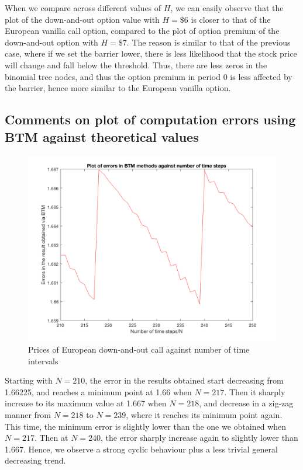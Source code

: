 When we compare across different values of $H$, we can easily observe that the plot of the down-and-out option value with $H=\$6$ is closer to that of the European vanilla call option, compared to the plot of option premium of the down-and-out option with $H = \$7$. The reason is similar to that of the previous case, where if we set the barrier lower, there is less likelihood that the stock price will change and fall below the threshold. Thus, there are less zeros in the binomial tree nodes, and thus the option premium in period 0 is less affected by the barrier, hence more similar to the European vanilla option.

\newpage

\subsection{Comments on plot of computation errors using BTM against theoretical values}
\begin{figure}[htbp!]
	\centering
	\includegraphics[scale=0.3]{A1_4_plot.PNG}
	\caption{Prices of European down-and-out call against number of time intervals}
\end{figure}

Starting with $N = 210$, the error in the results obtained start decreasing from 1.66225, and reaches a minimum point at 1.66 when $N = 217$. Then it sharply increase to its maximum value at 1.667 when $N = 218$, and decrease in a zig-zag manner from $N = 218$ to $N = 239$, where it reaches its minimum point again. This time, the minimum error is slightly lower than the one we obtained when $N = 217$. Then at $N = 240$, the error sharply increase again to slightly lower than 1.667. Hence, we observe a strong cyclic behaviour plus a less trivial general decreasing trend.

